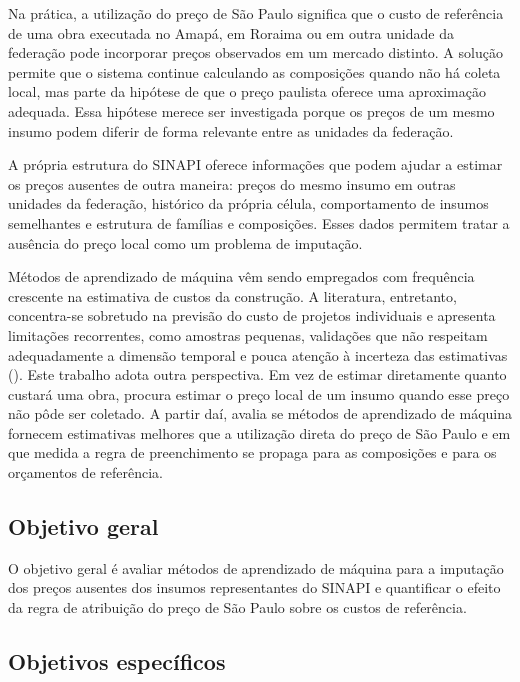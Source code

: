 Na prática, a utilização do preço de São Paulo significa que o custo de referência de 
uma obra executada no Amapá, em Roraima ou em outra unidade da federação pode incorporar 
preços observados em um mercado distinto. A solução permite que o sistema continue 
calculando as composições quando não há coleta local, mas parte da hipótese de que o 
preço paulista oferece uma aproximação adequada. Essa hipótese merece ser investigada 
porque os preços de um mesmo insumo podem diferir de forma relevante entre as unidades 
da federação.

A própria estrutura do SINAPI oferece informações que podem ajudar a estimar os preços 
ausentes de outra maneira: preços do mesmo insumo em outras unidades da federação, 
histórico da própria célula, comportamento de insumos semelhantes e estrutura de 
famílias e composições. Esses dados permitem tratar a ausência do preço local como um 
problema de imputação.

Métodos de aprendizado de máquina vêm sendo empregados com frequência crescente na 
estimativa de custos da construção. A literatura, entretanto, concentra-se sobretudo na 
previsão do custo de projetos individuais e apresenta limitações recorrentes, como 
amostras pequenas, validações que não respeitam adequadamente a dimensão temporal e 
pouca atenção à incerteza das estimativas (). 
Este trabalho adota outra perspectiva. Em vez de estimar diretamente quanto custará uma 
obra, procura estimar o preço local de um insumo quando esse preço não pôde ser coletado. 
A partir daí, avalia se métodos de aprendizado de máquina fornecem estimativas melhores 
que a utilização direta do preço de São Paulo e em que medida a regra de preenchimento 
se propaga para as composições e para os orçamentos de referência.

\subsection{Objetivo geral}

O objetivo geral é avaliar métodos de aprendizado de máquina para a imputação dos preços
ausentes dos insumos representantes do SINAPI e quantificar o efeito da regra de atribuição do
preço de São Paulo sobre os custos de referência.

\subsection{Objetivos específicos}

